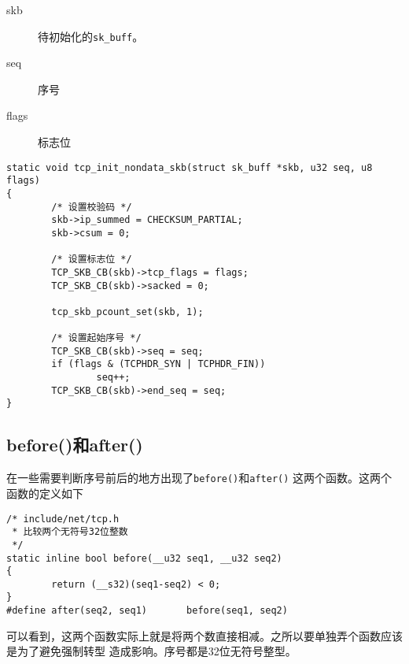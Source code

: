 \begin{description}
  \item[skb] 待初始化的\texttt{sk_buff}。
  \item[seq] 序号
  \item[flags] 标志位
\end{description}

\begin{verbatim}
static void tcp_init_nondata_skb(struct sk_buff *skb, u32 seq, u8 flags)
{
        /* 设置校验码 */
        skb->ip_summed = CHECKSUM_PARTIAL;
        skb->csum = 0;

        /* 设置标志位 */
        TCP_SKB_CB(skb)->tcp_flags = flags;
        TCP_SKB_CB(skb)->sacked = 0;

        tcp_skb_pcount_set(skb, 1);

        /* 设置起始序号 */
        TCP_SKB_CB(skb)->seq = seq;
        if (flags & (TCPHDR_SYN | TCPHDR_FIN))
                seq++;
        TCP_SKB_CB(skb)->end_seq = seq;
}
\end{verbatim}

\subsection{before()和after()}
在一些需要判断序号前后的地方出现了\texttt{before()}和\texttt{after()}
这两个函数。这两个函数的定义如下
\begin{verbatim}
/* include/net/tcp.h
 * 比较两个无符号32位整数
 */
static inline bool before(__u32 seq1, __u32 seq2)
{
        return (__s32)(seq1-seq2) < 0;
}
#define after(seq2, seq1)       before(seq1, seq2)
\end{verbatim}
可以看到，这两个函数实际上就是将两个数直接相减。之所以要单独弄个函数应该是为了避免强制转型
造成影响。序号都是32位无符号整型。


